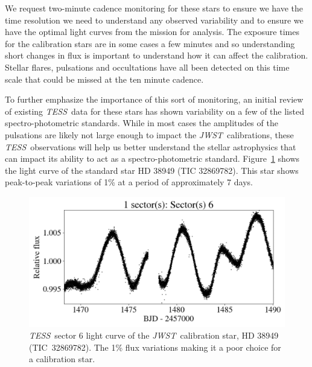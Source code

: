 \documentclass[letterpaper,12pt]{article}
\newcommand{\tess}{{\it TESS}}
\newcommand{\jwst}{{\it JWST}}
\begin{document}
We request two-minute cadence monitoring for these stars to ensure we have the time resolution we need to understand any observed variability and to ensure we have the optimal light curves from the mission for analysis. The exposure times for the calibration stars are in some cases a few minutes and so understanding short changes in flux is important to understand how it can affect the calibration. Stellar flares, pulsations and occultations have all been detected on this time scale that could be missed at the ten minute cadence.

To further emphasize the importance of this sort of monitoring, an initial review of existing \tess\ data for these stars has shown variability on a few of the listed spectro-photometric standards. While in most cases the amplitudes of the pulsations are likely not large enough to impact the \jwst\ calibrations, these \tess\ observations will help us better understand the stellar astrophysics that can impact its ability to act as a spectro-photometric standard. Figure~\ref{fig:lc} shows the light curve of the standard star HD 38949 (TIC 32869782). This star shows peak-to-peak variations of 1\% at a period of approximately 7 days.

\begin{figure}
    \centering
    \includegraphics[scale=.6]{HR38949_lc.png}
    \caption{\tess\ sector 6 light curve of the \jwst\ calibration star, HD 38949 (TIC~32869782). The 1\% flux variations making it a poor choice for a calibration star.}
    \label{fig:lc}
\end{figure}


\end{document}
